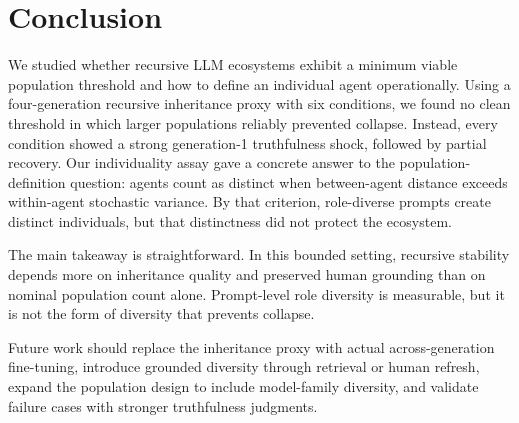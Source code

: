 \section{Conclusion}
\label{sec:conclusion}

We studied whether recursive LLM ecosystems exhibit a minimum viable population threshold and how to define an individual agent operationally. Using a four-generation recursive inheritance proxy with six conditions, we found no clean threshold in which larger populations reliably prevented collapse. Instead, every condition showed a strong generation-1 truthfulness shock, followed by partial recovery. Our individuality assay gave a concrete answer to the population-definition question: agents count as distinct when between-agent distance exceeds within-agent stochastic variance. By that criterion, role-diverse prompts create distinct individuals, but that distinctness did not protect the ecosystem.

The main takeaway is straightforward. In this bounded setting, recursive stability depends more on inheritance quality and preserved human grounding than on nominal population count alone. Prompt-level role diversity is measurable, but it is not the form of diversity that prevents collapse.

Future work should replace the inheritance proxy with actual across-generation fine-tuning, introduce grounded diversity through retrieval or human refresh, expand the population design to include model-family diversity, and validate failure cases with stronger truthfulness judgments.
